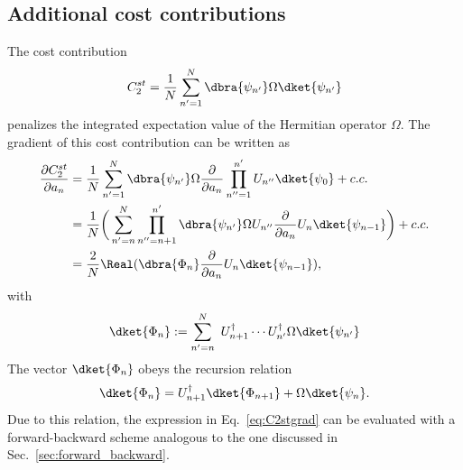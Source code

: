 \subsection{Additional cost contributions}
\label{sec:additional_costs}

The cost contribution 
\begin{equation}
\label{eq:c2st}
C_2^{st}=\frac{1}{N}\sum_{n'=1}^N \dbra{\psi_{n'}}\Omega \dket{\psi_{n'}}
\end{equation} 
penalizes the integrated expectation value of the Hermitian operator $\Omega$. The gradient of this cost contribution can be written as
\begin{align}
\nonumber \frac{\partial C_{2}^{st} }{\partial a_{n}}
&=\frac{1}{N}\sum_{n'=1}^N \dbra{\psi_{n'}}\Omega \frac{\partial }{\partial a_{n}}\prod_{n''=1}^{n'}U_{n''}\dket{\psi_{0}}+c.c.\\
\nonumber &=\frac{1}{N}\bigg(\sum_{n'=n}^N \prod_{n''=n+1}^{n'} \dbra{\psi_{n'}}\Omega U_{n''} \frac{\partial }{\partial a_{n}}U_n\dket{\psi_{n-1}}\bigg)+c.c.\\
\label{eq:C2stgrad} &=\frac{2}{N}\Real (\dbra{\Phi_{n}}\frac{\partial }{\partial a_{n}}U_n \dket{\psi_{n-1}}),
\end{align}
with
\begin{equation}
\label{eq:Phi_n}
    \dket{\Phi_n}:=\sum_{n'= n}^N~ U_{n+1}^\dagger \cdots U_{n'}^\dagger \Omega\dket{\psi_{n'}}
\end{equation}
The vector $\dket{\Phi_n}$ obeys the recursion relation
\begin{equation}
\label{eq:Phi_recursion}
    \dket{\Phi_n}=U_{n+1}^\dagger \dket{\Phi_{n+1}}+\Omega \dket{\psi_n}.
\end{equation}
Due to this relation, the expression in Eq.~\eqref{eq:C2stgrad} can be evaluated with a forward-backward scheme analogous to the one discussed in Sec.~\ref{sec:forward_backward}.

